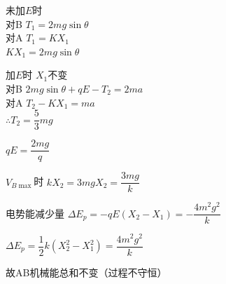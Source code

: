未加$E$时\\
\hspace*{1em}对B $T_1=2mg\sin\theta$\\
\hspace*{1em}对A $T_1=KX_1$\\
\hspace*{2em}$KX_1=2mg\sin\theta$

加$E$时 $X_1$不变\\
\hspace*{1em}对B $2mg\sin\theta+qE-T_2=2ma$\\
\hspace*{1em}对A $T_2-KX_1=ma$\\
\hspace*{2em}$\therefore T_2=\dfrac{5}{3}mg$

$q$\quad $E=\dfrac{2mg}{q}$

$V_{B\max}$时 $kX_2=3mg$\quad $X_2=\dfrac{3mg}{k}$

电势能减少量 $\Delta E_p=-qE(X_2-X_1)=-\dfrac{4m^2g^2}{k}$

$\Delta E_p=\dfrac12 k(X_2^2-X_1^2)=\dfrac{4m^2g^2}{k}$

故AB机械能总和不变（过程不守恒） %

